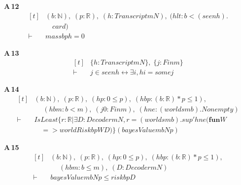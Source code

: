 \noindent\textbf{A\,12}\quad{}
{\footnotesize\[ \begin{aligned}[t]
&(\mathit{b} : \mathbb{N} ),\; (\mathit{p} : \mathbb{R} ),\; (\mathit{h} : \mathit{Transcript} \mathit{m} \mathit{N}),\; (\mathit{hlt} : \mathit{b} < (\mathit{seen} \mathit{h}).\\
&\quad \mathit{card})\\
\vdash\;&\mathit{mass} \mathit{b} \mathit{p} \mathit{h} = 0
\end{aligned} \]}

\noindent\textbf{A\,13}\quad{}
{\footnotesize\[ \begin{aligned}[t]
&\{ \mathit{h} : \mathit{Transcript} \mathit{m} \mathit{N}\},\; \{ \mathit{j} : \mathit{Fin} \mathit{m}\}\\
\vdash\;&\mathit{j} \in \mathit{seen} \mathit{h} \leftrightarrow \exists \mathit{i}, \mathit{h} \mathit{i} = \mathit{some} \mathit{j}
\end{aligned} \]}

\noindent\textbf{A\,14}\quad{}
{\footnotesize\[ \begin{aligned}[t]
&(\mathit{b} : \mathbb{N} ),\; (\mathit{p} : \mathbb{R} ),\; (\mathit{hp} : 0 \leq \mathit{p}),\; (\mathit{hbp} : (\mathit{b} : \mathbb{R} ) * \mathit{p} \leq 1),\\
&\quad \; (\mathit{hbm} : \mathit{b} < \mathit{m}),\; (\mathit{j0} : \mathit{Fin} \mathit{m}),\; (\mathit{hne} : (\mathit{worlds} \mathit{m} \mathit{b}).\mathit{Nonempty})\\
\vdash\;&\mathit{IsLeast} \{ \mathit{r} : \mathbb{R} | \exists \mathit{D} : \mathit{Decoder} \mathit{m} \mathit{N}, \mathit{r} = (\mathit{worlds} \mathit{m} \mathit{b}).\mathit{sup'} \mathit{hne} (\mathbf{fun} \mathit{W}\\
&\quad => \mathit{worldRisk} \mathit{b} \mathit{p} \mathit{W} \mathit{D})\} (\mathit{bayesValue} \mathit{m} \mathit{b} \mathit{N} \mathit{p})
\end{aligned} \]}

\noindent\textbf{A\,15}\quad{}
{\footnotesize\[ \begin{aligned}[t]
&(\mathit{b} : \mathbb{N} ),\; (\mathit{p} : \mathbb{R} ),\; (\mathit{hp} : 0 \leq \mathit{p}),\; (\mathit{hbp} : (\mathit{b} : \mathbb{R} ) * \mathit{p} \leq 1),\\
&\quad \; (\mathit{hbm} : \mathit{b} \leq \mathit{m}),\; (\mathit{D} : \mathit{Decoder} \mathit{m} \mathit{N})\\
\vdash\;&\mathit{bayesValue} \mathit{m} \mathit{b} \mathit{N} \mathit{p} \leq \mathit{risk} \mathit{b} \mathit{p} \mathit{D}
\end{aligned} \]}

